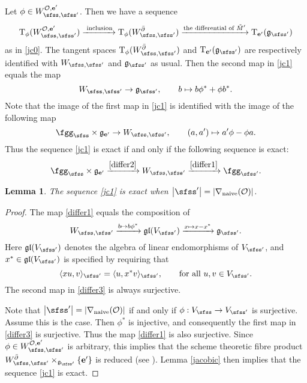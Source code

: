 \documentclass[12pt,a4paper]{amsart}
\def\abs#1{\left|{#1}\right|}
\newcommand{\CO}{{\mathcal {O}}}
\newcommand{\g}{\mathfrak g}
\newcommand{\la}{\langle}
\newcommand{\ra}{\rangle}
\newcommand{\be}{\begin {equation}}
\newcommand{\ee}{\end {equation}}
\numberwithin{equation}{section}
\newtheorem{lem}[thm]{Lemma}
\theoremstyle{remark}
\begin{document}
Let $\phi\in W_{\sfss, \sfss'}^{\CO, \mathbf e'}$. Then we have a sequence 
\be\label{jc1}
    \mathrm T_\phi (W_{\sfss, \sfss'}^{\CO, \mathbf e'})\xrightarrow{\textrm{ inclusion}} \mathrm T_\phi(W_{\sfss, \sfss'}^{\bar \partial})\xrightarrow{\textrm{the differential of $\tilde M'$}} \mathrm T_{\mathbf e'}(\g_{\sfss'})
\ee
as in \eqref{jc0}.  
The tangent spaces $\mathrm T_\phi(W_{\sfss, \sfss'}^{\bar \partial})$ and $\mathrm T_{\mathbf e'}(\g_{\sfss'})$ are respectively identified with $W_{\sfss, \sfss'}$ and $\g_{\sfss'}$ as usual. Then the second map in \eqref{jc1} equals the map 
\be\label{differ1}
  W_{\sfss, \sfss'}\rightarrow \g_{\sfss'}, \qquad b\mapsto b\ww^{*}+\ww b^{*} . 
\ee
Note that the  image of the first map in \eqref{jc1} is identified with the image of the following map
\be\label{differ2}
 \fggs\times  \g_{\mathbf e'} \rightarrow W_{\sfss, \sfss'}, \qquad (a,a')\mapsto a'\ww - \ww a.
\ee
Thus the sequence \eqref{jc1} is exact if and only if the following sequence is exact: 
\begin{equation}\label{eq:CGG}
  \fggs\times  \g_{\mathbf e'} \xrightarrow{\eqref{differ2} } W_{\sfss, \sfss'}
  \xrightarrow{\eqref{differ1}} \fggsp.
\end{equation}




\begin{lem}\label{lemexact1}
The sequence \eqref{jc1} is exact when $\abs{\sfss'}=\abs{\nabla_{\mathrm{naive}}(\CO)}$.
\end{lem}
\begin{proof}
The map \eqref{differ1} equals the composition of 
\be\label{differ3}
  W_{\sfss, \sfss'}\xrightarrow{b\mapsto b\phi^*} \g\mathfrak l(V_{\sfss'})\xrightarrow{x\mapsto x-x^*} \g_{\sfss'}.
\ee
Here $ \g\mathfrak l(V_{\sfss'})$ denotes the algebra of  linear endomorphisms of $V_{\sfss'}$, and $x^*\in  \g\mathfrak l(V_{\sfss'})$ is specified by requiring that
\be\label{ajoint4}
  \la x u, v\ra_{\sfss'}=\la u, x^* v\ra_{\sfss'},\qquad \textrm{for all }u,v\in V_{\sfss'}. 
\ee
The second map in \eqref{differ3} is always surjective. 

Note that $\abs{\sfss'}=\abs{\nabla_{\mathrm{naive}}(\CO)}$ if and only if  $\phi: V_{\sfss}\rightarrow V_{\sfss'}$ is surjective. Assume this is the case. Then $\phi^*$ is injective, and consequently the first map in  \eqref{differ3}  is  surjective. Thus the map \eqref{differ1} is also surjective. Since $\phi\in W_{\sfss, \sfss'}^{\CO, \mathbf e'}$ is arbitrary, this implies that the scheme theoretic  fibre product 
$W_{\sfss, \sfss'}^{\bar \partial}\times_{\g_{\sfss'}}\{\mathbf e'\}$ is reduced (see \cite[Proposition~10.4]{HS}). Lemma \ref{jacobic} then implies that the sequence \eqref{jc1} is exact.


\end{proof}
\end{document}
